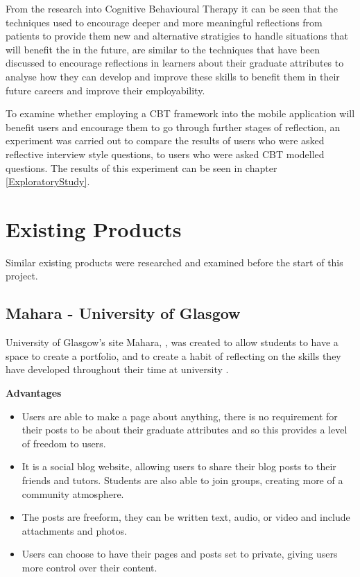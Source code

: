 \documentclass{l4proj}
\begin{document}
From the research into Cognitive Behavioural Therapy it can be seen that the techniques used to encourage deeper and more meaningful reflections from patients to provide them new and alternative stratigies to handle situations that will benefit the in the future, are similar to the techniques that have been discussed to encourage reflections in learners about their graduate attributes to analyse how they can develop and improve these skills to benefit them in their future careers and improve their employability.

To examine whether employing a CBT framework into the mobile application will benefit users and encourage them to go through further stages of reflection, an experiment was carried out to compare the results of users who were asked reflective interview style questions, to users who were asked CBT modelled questions. The results of this experiment can be seen in chapter \ref{ExploratoryStudy}.

\section{Existing Products}

Similar existing products were researched and examined before the start of this project.

\subsection{Mahara - University of Glasgow}

University of Glasgow's site Mahara, \citep{mahara_dashboard}, was created to allow students to have a space to create a portfolio, and to create a habit of reflecting on the skills they have developed throughout their time at university \citep{glasgow_university_attributes}.

\textbf{Advantages}
\begin{itemize}
    \item Users are able to make a page about anything, there is no requirement for their posts to be about their graduate attributes and so this provides 
    a level of freedom to users.
    \item It is a social blog website, allowing users to share their blog posts to their friends and tutors. Students are also able to join groups, creating 
    more of a community atmosphere.
    \item The posts are freeform, they can be written text, audio, or video and include attachments and photos. 
    \item Users can choose to have their pages and posts set to private, giving users more control over their content.
\end{itemize}
\end{document}
